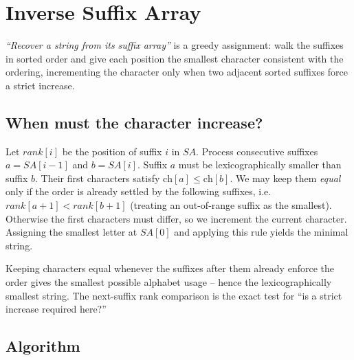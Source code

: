 \section{Inverse Suffix Array}
\label{sec:cses-inverse-suffix-array}


\begin{patternbox}
\emph{``Recover a string from its suffix array''} is a greedy assignment:
walk the suffixes in sorted order and give each position the smallest
character consistent with the ordering, incrementing the character only
when two adjacent sorted suffixes force a strict increase.
\end{patternbox}

\subsection*{When must the character increase?}

Let $\textit{rank}[i]$ be the position of suffix $i$ in $\textit{SA}$.
Process consecutive suffixes $a=\textit{SA}[i-1]$ and $b=\textit{SA}[i]$.
Suffix $a$ must be lexicographically smaller than suffix $b$. Their first
characters satisfy $\text{ch}[a]\le\text{ch}[b]$. We may keep them
\emph{equal} only if the order is already settled by the following
suffixes, i.e.\ $\textit{rank}[a+1]<\textit{rank}[b+1]$ (treating an
out-of-range suffix as the smallest). Otherwise the first characters must
differ, so we increment the current character. Assigning the smallest
letter at $\textit{SA}[0]$ and applying this rule yields the minimal
string.

\begin{ideabox}
Keeping characters equal whenever the suffixes after them already
enforce the order gives the smallest possible alphabet usage -- hence the
lexicographically smallest string. The next-suffix rank comparison is the
exact test for ``is a strict increase required here?''
\end{ideabox}

\subsection*{Algorithm}

